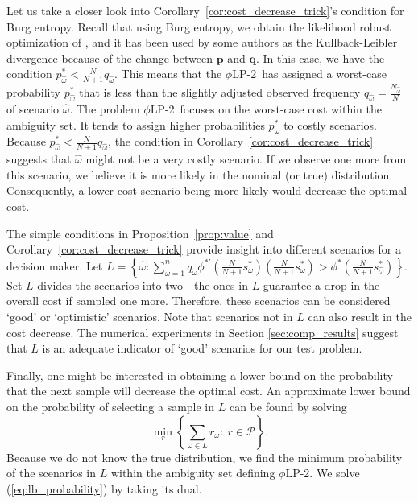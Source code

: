 \documentclass[opre,nonblindrev]{informs3} %
\newcommand{\q}{\mathbf{q}}
\newcommand{\p}{\mathbf{p}}
\newcommand{\plp}{$\phi$LP-2}
\begin{document}
Let us take a closer look into Corollary~\ref{cor:cost_decrease_trick}'s condition for Burg entropy. 
Recall that using Burg entropy, we obtain the likelihood robust optimization of \cite{wang2010likelihood}, and it has been used by some authors as the Kullback-Leibler divergence because of the change between $\p$ and $\q$. 
In this case, we have the condition $p_{\hat{\omega}}^* < \frac{N}{N+1}q_{\hat{\omega}}$.  
This means that the \plp\ has assigned a worst-case probability  $p_{\hat{\omega}}^*$ that is less than the slightly adjusted observed frequency $q_{\hat{\omega}}=\frac{N_{\hat{\omega}}}{N}$ of scenario $\hat{\omega}$. 
The problem \plp\ focuses on the worst-case cost within the ambiguity set. 
It tends to assign higher probabilities $p_\omega^*$ to costly 
scenarios. 
Because $p_{\hat{\omega}}^* < \frac{N}{N+1}q_{\hat{\omega}}$, the condition in Corollary~\ref{cor:cost_decrease_trick} suggests that $\hat{\omega}$ might not be a very costly scenario. 
If we observe one more from this scenario, we believe it is more likely in the nominal (or true) distribution. 
Consequently, a lower-cost scenario being more likely would decrease the optimal cost. 


The simple conditions in Proposition~\ref{prop:value} and Corollary~\ref{cor:cost_decrease_trick} provide insight into different scenarios for a decision maker. 
Let $L = \left\{ \hat{\omega} : \sum_{\omega=1}^n q_\omega \phi^{*\prime}\left(\frac{N}{N+1}s^*_\omega\right) \left(\frac{N}{N+1}s^*_\omega\right) > \phi^*\left(\frac{N}{N+1}s^*_{\hat{\omega}}\right) \right\}$.
Set $L$ divides the scenarios into two---the ones in $L$ guarantee a drop in the overall cost if sampled one more.
Therefore, these scenarios can be considered `good' or `optimistic' scenarios. 
Note that scenarios not in $L$ can also result in the cost decrease. 
The numerical experiments in Section \ref{sec:comp_results} suggest that $L$ is an adequate indicator of `good' scenarios for our test problem. 
 



Finally, one might be interested in obtaining a lower bound on the probability that the next sample will decrease the optimal cost. 
An approximate lower bound on the probability of selecting a sample in $L$ can be found by solving
\begin{equation}
	\min_{r} \left\{ \sum_{\omega \in L} r_\omega \colon\ r \in \mathcal{P} \right\}. \label{eq:lb_probability}
\end{equation}
Because we do not know the true distribution, we find the minimum probability of the scenarios in $L$ within the ambiguity set defining \plp.
We solve (\ref{eq:lb_probability}) by taking its dual.
\end{document}
